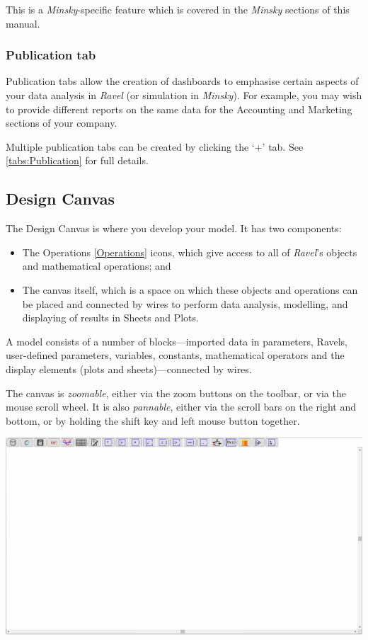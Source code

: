 \label{tabs:Phillips}

This is a \emph{Minsky}-specific feature which is covered in the \emph{Minsky
}sections of this manual.

\subsubsection{Publication tab}

Publication tabs allow the creation of dashboards to emphasise certain
aspects of your data analysis in \emph{Ravel }(or simulation in \emph{Minsky}).
For example, you may wish to provide different reports on the same
data for the Accounting and Marketing sections of your company.

Multiple publication tabs can be created by clicking the `+' tab.
See \ref{tabs:Publication} for full details.

\subsection{Design Canvas}

\label{DesignCanvas}

The Design Canvas is where you develop your model. It has two components:
\begin{itemize}
\item The Operations \ref{Operations} icons, which give access to all of
\emph{Ravel}'s objects and mathematical operations; and
\item The canvas itself, which is a space on which these objects and operations
can be placed and connected by wires to perform data analysis, modelling,
and displaying of results in Sheets and Plots.
\end{itemize}
A model consists of a number of blocks---imported data in parameters,
Ravels, user-defined parameters, variables, constants, mathematical
operators and the display elements (plots and sheets)---connected
by wires.

The canvas is \emph{zoomable}, either via the zoom buttons on the
toolbar, or via the mouse scroll wheel. It is also \emph{pannable},
either via the scroll bars on the right and bottom, or by holding
the shift key and left mouse button together. 

\noindent\includegraphics[width=\textwidth]{images/DesignCanvas}

